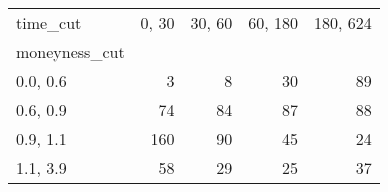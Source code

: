 \begin{tabular}{lrrrr}
\toprule
time\_cut &  0, 30 &  30, 60 &  60, 180 &  180, 624 \\
moneyness\_cut &          &           &            &             \\
\midrule
0.0, 0.6    &        3 &         8 &         30 &          89 \\
0.6, 0.9    &       74 &        84 &         87 &          88 \\
0.9, 1.1    &      160 &        90 &         45 &          24 \\
1.1, 3.9    &       58 &        29 &         25 &          37 \\
\bottomrule
\end{tabular}
